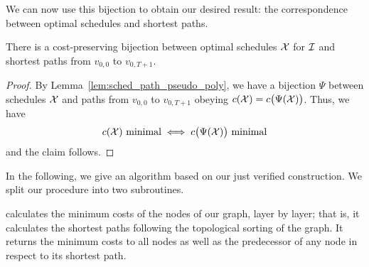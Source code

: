 We can now use this bijection to obtain our desired result: the correspondence between optimal schedules and shortest paths.
\begin{thm}\label{thm:opt_sched_short_path_pseudo_poly}
There is a cost-preserving bijection between optimal schedules $\mathcal{X}$ for $\mathcal{I}$ and shortest paths from $v_{0,0}$ to $v_{0,T+1}$.
\end{thm} 
\begin{proof}
By Lemma~\ref{lem:sched_path_pseudo_poly}, we have a bijection $\Psi$ between schedules $\mathcal{X}$ and paths from $v_{0,0}$ to $v_{0,T+1}$ obeying $c(\mathcal{X})=c\bigl(\Psi(\mathcal{X})\bigr)$. Thus, we have 
\begin{equation*}
	c(\mathcal{X})\text{ minimal}\iff c\bigl(\Psi(\mathcal{X})\big)\text{ minimal}
\end{equation*}
and the claim follows.
\end{proof}
In the following, we give an algorithm based on our just verified construction. 
We split our procedure into two subroutines. 

 calculates the minimum costs of the nodes of our graph, layer by layer; that is, it calculates the shortest paths following the topological sorting of the graph. It returns the minimum costs to all nodes as well as the predecessor of any node in respect to its shortest path.

